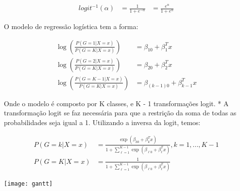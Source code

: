\begin{equation}
  \label{eq:t}
  \begin{aligned}
    logit^{-1}(\alpha) &= \frac{1}{1+e^{-\alpha}} &= \frac{e^{\alpha}}{1+e^{\alpha}}
  \end{aligned}
\end{equation}

O modelo de regressão logística tem a forma:

\begin{equation}
  \label{eq:t}
  \begin{aligned}
    \log\left ( \frac{P(G = 1 | X = x)}{P(G = K | X = x)} \right ) &= \beta_{10}+\beta_{1}^{T}x\\
    \log\left ( \frac{P(G = 2 | X = x)}{P(G = K | X = x)} \right ) &= \beta_{20}+\beta_{2}^{T}x\\
    \log\left ( \frac{P(G = K-1 | X = x)}{P(G = K | X = x)} \right ) &= \beta_{(k-1)0}+\beta_{k-1}^{T}x
  \end{aligned}
\end{equation}

Onde o modelo \cite{HASTIE} é composto por K classes, e K - 1 transformações logit. * A transformação logit se faz necessária para que a restrição da soma de todas as probabilidades seja igual a 1. Utilizando a inversa da logit, temos:

\begin{equation}
  \label{eq:t}
  \begin{aligned}
    P(G = k | X = x) &= \frac{\exp \left ( \beta_{k0}+\beta_{k}^{T}x \right )}{1 + \sum_{\ell=1}^{K - 1}\exp \left ( \beta_{\ell0}+\beta_{\ell}^{T}x \right )}, k = 1, ..., K - 1\\
    P(G = K | X = x) &= \frac{1}{1 + \sum_{\ell=1}^{K - 1}\exp \left ( \beta_{\ell0}+\beta_{\ell}^{T}x \right )}
  \end{aligned}
\end{equation}


\texttt{[image: gantt]}